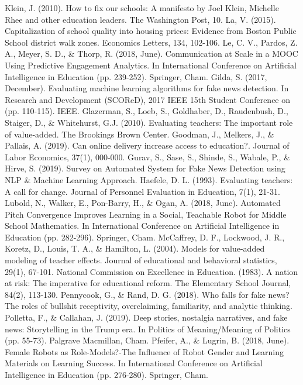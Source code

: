 \documentclass[12pt, final]{article}
\begin{document}
\begin{thebibliography}{1}
    Klein, J. (2010). How to fix our schools: A manifesto by Joel Klein, Michelle Rhee and other education leaders. The Washington Post, 10.
    La, V. (2015). Capitalization of school quality into housing prices: Evidence from Boston Public School district walk zones. Economics Letters, 134, 102-106.
    Le, C. V., Pardos, Z. A., Meyer, S. D., \& Thorp, R. (2018, June). Communication at Scale in a MOOC Using Predictive Engagement Analytics. In International Conference on Artificial Intelligence in Education (pp. 239-252). Springer, Cham.
    Gilda, S. (2017, December). Evaluating machine learning algorithms for fake news detection. In Research and Development (SCOReD), 2017 IEEE 15th Student Conference on (pp. 110-115). IEEE.
     Glazerman, S., Loeb, S., Goldhaber, D., Raudenbush, D., Staiger, D., \& Whitehurst, G.J. (2010). Evaluating teachers: The important role of value-added. The Brookings Brown Center.
     Goodman, J., Melkers, J., \& Pallais, A. (2019). Can online delivery increase access to education?. Journal of Labor Economics, 37(1), 000-000.
     Gurav, S., Sase, S., Shinde, S., Wabale, P., \& Hirve, S. (2019). Survey on Automated System for Fake News Detection using NLP \& Machine Learning Approach.
     Haefele, D. L. (1993). Evaluating teachers: A call for change. Journal of Personnel Evaluation in Education, 7(1), 21-31.
     Lubold, N., Walker, E., Pon-Barry, H., \& Ogan, A. (2018, June). Automated Pitch Convergence Improves Learning in a Social, Teachable Robot for Middle School Mathematics. In International Conference on Artificial Intelligence in Education (pp. 282-296). Springer, Cham.
     McCaffrey, D. F., Lockwood, J. R., Koretz, D., Louis, T. A., \& Hamilton, L. (2004). Models for value-added modeling of teacher effects. Journal of educational and behavioral statistics, 29(1), 67-101.
     National Commission on Excellence in Education. (1983). A nation at risk: The imperative for educational reform. The Elementary School Journal, 84(2), 113-130.
     Pennycook, G., \& Rand, D. G. (2018). Who falls for fake news? The roles of bullshit receptivity, overclaiming, familiarity, and analytic thinking.
     Polletta, F., \& Callahan, J. (2019). Deep stories, nostalgia narratives, and fake news: Storytelling in the Trump era. In Politics of Meaning/Meaning of Politics (pp. 55-73). Palgrave Macmillan, Cham.
     Pfeifer, A., \& Lugrin, B. (2018, June). Female Robots as Role-Models?-The Influence of Robot Gender and Learning Materials on Learning Success. In International Conference on Artificial Intelligence in Education (pp. 276-280). Springer, Cham.

\end{thebibliography}
\end{document}

